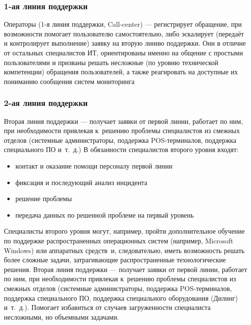 \documentclass{../industrial-development}
\begin{document}
\lecturenotes

\begin{frame} \frametitle{1-ая линия поддержки}

    Операторы (1-я линия поддержки, Call-center) — регистрирует обращение, при возможности помогает пользователю самостоятельно, либо эскалирует (передаёт и контролирует выполнение) заявку на вторую линию поддержки.
    \newline
    \newline
    Они в отличие от остальных специалистов ИТ, ориентированы именно на общение с простыми пользователями и призваны решать несложные (по уровню технической компетенции) обращения пользователей, а также реагировать на доступные их пониманию сообщения систем мониторинга

\end{frame}
\lecturenotes

\begin{frame} \frametitle{2-ая линия поддержки}

    Вторая линия поддержки — получает заявки от первой линии, работает по ним, при необходимости привлекая к~решению проблемы специалистов из смежных отделов (системные администраторы, поддержка POS-терминалов, поддержка специального ПО и~т.~д.)
    \newline
    \newline
    В обязанности специалистов второго уровня входят: 
	\begin{itemize}
        \item контакт и оказание помощи персоналу первой линии
        \item фиксация и последующий анализ инцидента
        \item решение проблемы
        \item передача данных по решенной проблеме на первый уровень
	\end{itemize}
\end{frame}
\lecturenotes
Специалисты второго уровня могут, например, пройти дополнительное обучение по поддержке распространенных операционных систем (например, Microsoft Windows) или аппаратных средств~и, следовательно, иметь возможность решать более сложные задачи, затрагивающие распространенные технологические решения.
    Вторая линия поддержки — получает заявки от первой линии, работает по ним, при необходимости привлекая к~решению проблемы специалистов из смежных отделов (системные администраторы, поддержка POS-терминалов, поддержка специального ПО, поддержка специального оборудования (Дилинг) и~т.~д.). Помогает избавиться от случаев загруженности специалиста несложными, но объемными задачами.
\end{document}
